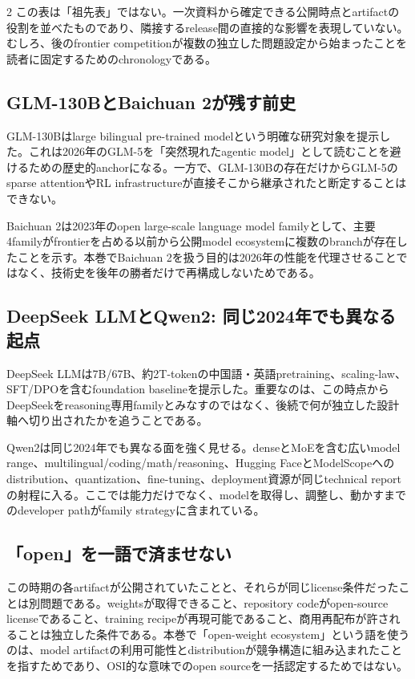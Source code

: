 \documentclass[lualatex,a4paper,10pt]{jlreq}
\begin{document}
\begin{multicols}{2}
\raggedcolumns
この表は「祖先表」ではない。一次資料から確定できる公開時点とartifactの役割を並べたものであり、隣接するrelease間の直接的な影響を表現していない。むしろ、後のfrontier competitionが複数の独立した問題設定から始まったことを読者に固定するためのchronologyである。

\subsection{GLM-130BとBaichuan 2が残す前史}
GLM-130Bはlarge bilingual pre-trained modelという明確な研究対象を提示した。これは2026年のGLM-5を「突然現れたagentic model」として読むことを避けるための歴史的anchorになる。一方で、GLM-130Bの存在だけからGLM-5のsparse attentionやRL infrastructureが直接そこから継承されたと断定することはできない。\autocite{glm130b}

Baichuan 2は2023年のopen large-scale language model familyとして、主要4familyがfrontierを占める以前から公開model ecosystemに複数のbranchが存在したことを示す。本巻でBaichuan 2を扱う目的は2026年の性能を代理させることではなく、技術史を後年の勝者だけで再構成しないためである。\autocite{baichuan2}

\subsection{DeepSeek LLMとQwen2: 同じ2024年でも異なる起点}
DeepSeek LLMは7B/67B、約2T-tokenの中国語・英語pretraining、scaling-law、SFT/DPOを含むfoundation baselineを提示した。重要なのは、この時点からDeepSeekをreasoning専用familyとみなすのではなく、後続で何が独立した設計軸へ切り出されたかを追うことである。\autocite{deepseekllm}

Qwen2は同じ2024年でも異なる面を強く見せる。denseとMoEを含む広いmodel range、multilingual/coding/math/reasoning、Hugging FaceとModelScopeへのdistribution、quantization、fine-tuning、deployment資源が同じtechnical reportの射程に入る。ここでは能力だけでなく、modelを取得し、調整し、動かすまでのdeveloper pathがfamily strategyに含まれている。\autocite{qwen2}

\subsection{「open」を一語で済ませない}
この時期の各artifactが公開されていたことと、それらが同じlicense条件だったことは別問題である。weightsが取得できること、repository codeがopen-source licenseであること、training recipeが再現可能であること、商用再配布が許されることは独立した条件である。本巻で「open-weight ecosystem」という語を使うのは、model artifactの利用可能性とdistributionが競争構造に組み込まれたことを指すためであり、OSI的な意味でのopen sourceを一括認定するためではない。


\end{multicols}
\end{document}

